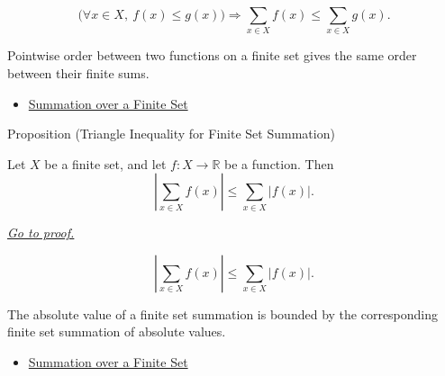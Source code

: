 \begin{remark*}
\[
  \bigl(\forall x\in X,\ f(x)\le g(x)\bigr)
  \Longrightarrow
  \sum_{x\in X} f(x)
  \le
  \sum_{x\in X} g(x).
\]
\end{remark*}

\begin{remark*}[Interpretation]
Pointwise order between two functions on a finite set gives the same
order between their finite sums.
\end{remark*}

\begin{dependencies}
\begin{itemize}
  \item \hyperref[def:summation-over-finite-set]{Summation over a Finite Set}
\end{itemize}
\end{dependencies}

\begin{propositionbox}{Proposition (Triangle Inequality for Finite Set Summation)}
\begin{proposition}
\label{prop:triangle-inequality-finite-set-summation}

Let \(X\) be a finite set, and let \(f:X\to\mathbb{R}\) be a function.
Then
\[
  \left\lvert \sum_{x\in X} f(x) \right\rvert
  \le
  \sum_{x\in X} \lvert f(x)\rvert.
\]

\smallskip
\noindent
\hyperref[prf:triangle-inequality-finite-set-summation]{\textit{Go to proof.}}
\end{proposition}
\end{propositionbox}

\begin{remark*}
\[
  \left\lvert \sum_{x\in X}f(x)\right\rvert
  \le
  \sum_{x\in X}|f(x)|.
\]
\end{remark*}

\begin{remark*}[Interpretation]
The absolute value of a finite set summation is bounded by the
corresponding finite set summation of absolute values.
\end{remark*}

\begin{dependencies}
\begin{itemize}
  \item \hyperref[def:summation-over-finite-set]{Summation over a Finite Set}
\end{itemize}
\end{dependencies}

